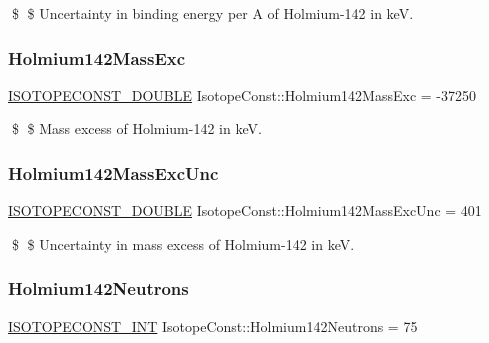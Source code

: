 \$ \$ Uncertainty in binding energy per A of Holmium-\/142 in keV. \mbox{\label{group___isotope_const-_holmium-_ho142_ga6356165ee52eb499b83b76dc661aa02a}} 
\subsubsection{\texorpdfstring{Holmium142\+Mass\+Exc}{Holmium142MassExc}}
{\footnotesize\ttfamily \mbox{\hyperlink{group___isotope_const-_macros_ga8f45a7272ce02c0b4c65c44636ed719a}{I\+S\+O\+T\+O\+P\+E\+C\+O\+N\+S\+T\+\_\+\+D\+O\+U\+B\+LE}} Isotope\+Const\+::\+Holmium142\+Mass\+Exc = -\/37250}

\$ \$ Mass excess of Holmium-\/142 in keV. \mbox{\label{group___isotope_const-_holmium-_ho142_gad9bf8966328422146224f802668b5f8c}} 
\subsubsection{\texorpdfstring{Holmium142\+Mass\+Exc\+Unc}{Holmium142MassExcUnc}}
{\footnotesize\ttfamily \mbox{\hyperlink{group___isotope_const-_macros_ga8f45a7272ce02c0b4c65c44636ed719a}{I\+S\+O\+T\+O\+P\+E\+C\+O\+N\+S\+T\+\_\+\+D\+O\+U\+B\+LE}} Isotope\+Const\+::\+Holmium142\+Mass\+Exc\+Unc = 401}

\$ \$ Uncertainty in mass excess of Holmium-\/142 in keV. \mbox{\label{group___isotope_const-_holmium-_ho142_ga0404c0de604a29d12cc9645cc4f6e66f}} 
\subsubsection{\texorpdfstring{Holmium142\+Neutrons}{Holmium142Neutrons}}
{\footnotesize\ttfamily \mbox{\hyperlink{group___isotope_const-_macros_ga5f18360b3e99483a35c32d789e62621c}{I\+S\+O\+T\+O\+P\+E\+C\+O\+N\+S\+T\+\_\+\+I\+NT}} Isotope\+Const\+::\+Holmium142\+Neutrons = 75}

